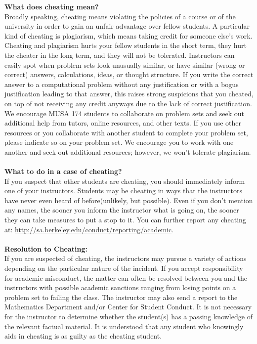\documentclass[11pt, a4paper]{article}
\begin{document}
\noindent\textbf{What does cheating mean?} \\
Broadly speaking, cheating means violating the policies of a
course or of the university in order to gain an unfair advantage over fellow students. A particular
kind of cheating is plagiarism, which means taking credit for someone else’s work. Cheating and
plagiarism hurts your fellow students in the short term, they hurt the cheater in the long term, and
they will not be tolerated. Instructors can easily spot when problem sets look unusually similar, or have similar
(wrong or correct) answers, calculations, ideas, or thought structure. If you write the correct answer to a computational problem without any justification or with a bogus justification leading to that answer, this raises strong suspicions that you cheated, on top of not
receiving any credit anyways due to the lack of correct justification. We encourage MUSA 174 students to collaborate on problem sets and seek out additional help from tutors, online resources, and other texts. If you use other resources or you collaborate with another student to complete your problem set, please indicate so on your problem set. We encourage you to work with one another and seek out additional resources; however, we won't tolerate plagiarism. 
\\ \\
 \textbf{What to do in a case of cheating?}
 \\
 If you suspect that other students are cheating, you
should immediately inform one of your instructors. Students may be cheating in ways that the instructors have never even heard of before(unlikely, but possible). Even if you don’t mention any names, the sooner you inform the instructor what is going on, the sooner they can take measures to put a stop to it. You can further report any cheating at:
\url{http://sa.berkeley.edu/conduct/reporting/academic}.
\\ \\
\textbf{Resolution to Cheating:}
\\ If you are suspected of cheating, the instructors may pursue a variety of actions depending on the particular nature of the incident. If you accept responsibility
for academic misconduct, the matter can often be resolved between you and the instructors with
possible academic sanctions ranging from losing points on a problem set to failing the class. The instructor may also
send a report to the Mathematics Department and/or Center for Student Conduct. It is not
necessary for the instructor to determine whether the student(s) has a passing knowledge of the
relevant factual material. It is understood that any student who knowingly aids in cheating is as guilty as the cheating student.
\newpage
\end{document}
